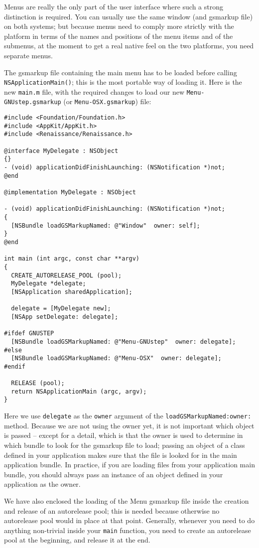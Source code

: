 \documentclass[a4paper]{article}
\begin{document}
Menus are really the only part of the user interface where such a
strong distinction is required.  You can usually use the same window
(and gsmarkup file) on both systems; but because menus need to comply
more strictly with the platform in terms of the names and positions of
the menu items and of the submenus, at the moment to get a real native
feel on the two platforms, you need separate menus.

The gsmarkup file containing the main menu has to be loaded before
calling \texttt{NSApplicationMain()}; this is the most portable way of
loading it.  Here is the new \texttt{main.m} file, with the required
changes to load our new \texttt{Menu-GNUstep.gsmarkup} (or
\texttt{Menu-OSX.gsmarkup}) file:
\begin{verbatim}
#include <Foundation/Foundation.h>
#include <AppKit/AppKit.h>
#include <Renaissance/Renaissance.h>

@interface MyDelegate : NSObject
{}
- (void) applicationDidFinishLaunching: (NSNotification *)not;
@end

@implementation MyDelegate : NSObject 

- (void) applicationDidFinishLaunching: (NSNotification *)not;
{
  [NSBundle loadGSMarkupNamed: @"Window"  owner: self];
}
@end

int main (int argc, const char **argv)
{ 
  CREATE_AUTORELEASE_POOL (pool);
  MyDelegate *delegate;
  [NSApplication sharedApplication];

  delegate = [MyDelegate new];
  [NSApp setDelegate: delegate];

#ifdef GNUSTEP
  [NSBundle loadGSMarkupNamed: @"Menu-GNUstep"  owner: delegate];
#else
  [NSBundle loadGSMarkupNamed: @"Menu-OSX"  owner: delegate];
#endif

  RELEASE (pool);
  return NSApplicationMain (argc, argv);
}
\end{verbatim}
Here we use \texttt{delegate} as the \texttt{owner} argument of the
\texttt{loadGSMarkupNamed:owner:} method.  Because we are not using
the owner yet, it is not important which object is passed -- except
for a detail, which is that the owner is used to determine in which
bundle to look for the gsmarkup file to load; passing an object of a
class defined in your application makes sure that the file is looked
for in the main application bundle.  In practice, if you are loading
files from your application main bundle, you should always pass an
instance of an object defined in your application as the owner.

We have also enclosed the loading of the Menu gsmarkup file inside the
creation and release of an autorelease pool; this is needed because
otherwise no autorelease pool would in place at that point.
Generally, whenever you need to do anything non-trivial inside your
\texttt{main} function, you need to create an autorelease pool 
at the beginning, and release it at the end.
\end{document}
